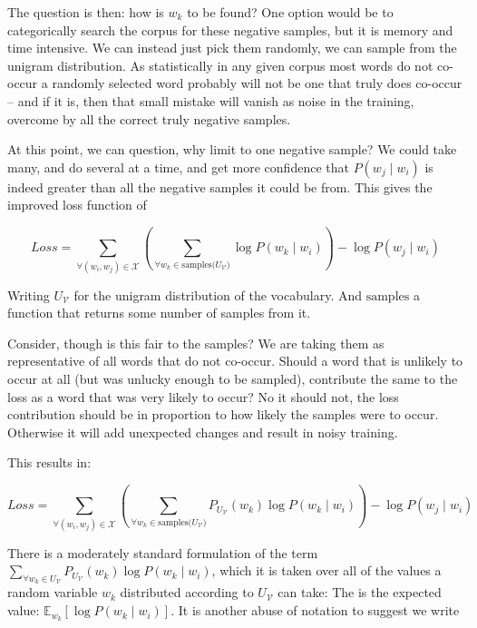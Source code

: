 \documentclass[parskip]{komatufte}
\begin{document}
The question is then: how is $w_k$ to be found?
One option would be to categorically search the corpus for these negative samples,
but it is memory and time intensive.
We can instead just pick them randomly,
we can sample from the unigram distribution.
As statistically in any given corpus most words do not co-occur 
a randomly selected word probably will not be one that truly does co-occur
-- and if it is, then that small mistake will vanish as noise in the training,
overcome by all the correct truly negative samples.


At this point, we can question, why limit to one negative sample?
We could take many, and do several at a time,
and get more confidence that $P(w_j\mid w_i)$ is indeed greater than all the negative samples it could be from.
This gives the improved loss function of 

\begin{equation}
Loss = \sum_{\forall (w_i,w_j)\in \mathcal{X}} 
\left(\sum_{\forall w_k \in \text{samples($U_{\mathcal{V}}$)}}
 \log P(w_k\mid w_i) \right) 
 -\log P(w_j\mid w_i)
\end{equation}

Writing $U_{\mathcal{V}}$ for the unigram distribution of the vocabulary.
And $\text{samples}$ a function that returns some number of samples from it.

Consider, though is this fair to the samples?
We are taking them as representative of all words that do not co-occur.
Should a word that is unlikely to occur at all (but was unlucky enough to be sampled), contribute the same to the loss as a word that was very likely to occur?
No it should not, the loss contribution should be in proportion to how likely the samples were to occur.
Otherwise it will add unexpected changes and result in noisy training.

This results in:

\begin{equation}
Loss = \sum_{\forall (w_i,w_j)\in \mathcal{X}} 
\left(\sum_{\forall w_k \in \text{samples($U_{\mathcal{V}}$)}}
P_{U_\mathcal{V}}(w_k) \log P(w_k\mid w_i) \right)
-\log P(w_j\mid w_i)
\end{equation}

There is a moderately standard formulation of the term $\sum_{\forall w_k \in U_{\mathcal{V}}}
P_{U_\mathcal{V}}(w_k) \log P(w_k\mid w_i)$,
which it is taken over all of the values a random variable $w_k$  distributed according to $U_{\mathcal{V}}$ can take:
The is the expected value: $\mathbb{E}_{w_k} [\log P(w_k\mid w_i)]$.
It is another abuse of notation to suggest we write
\end{document}
